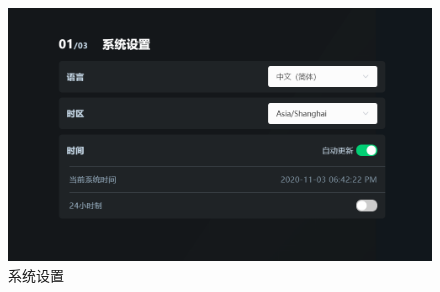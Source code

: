 \begin{figure}[ht]
    \centering
    \includegraphics[width=\textwidth]{screen/2-5.png}
    \caption{系统设置}
    \label{fig:系统设置}
\end{figure}

